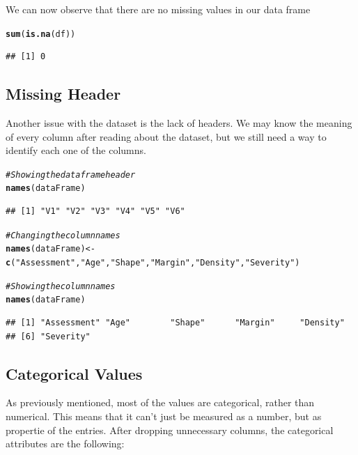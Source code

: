 \documentclass[a4paper,12pt]{article}\usepackage[]{graphicx}\usepackage[]{color}
\makeatletter
\newcommand{\hlstr}[1]{\textcolor[rgb]{0.192,0.494,0.8}{#1}}%
\newcommand{\hlcom}[1]{\textcolor[rgb]{0.678,0.584,0.686}{\textit{#1}}}%
\newcommand{\hlstd}[1]{\textcolor[rgb]{0.345,0.345,0.345}{#1}}%
\newcommand{\hlkwb}[1]{\textcolor[rgb]{0.69,0.353,0.396}{#1}}%
\newcommand{\hlkwd}[1]{\textcolor[rgb]{0.737,0.353,0.396}{\textbf{#1}}}%
\newenvironment{kframe}{%
 \def\at@end@of@kframe{}%
 \ifinner\ifhmode%
  \def\at@end@of@kframe{\end{minipage}}%
  \begin{minipage}{\columnwidth}%
 \fi\fi%
 \def\FrameCommand##1{\hskip\@totalleftmargin \hskip-\fboxsep
 \colorbox{shadecolor}{##1}\hskip-\fboxsep
     \hskip-\linewidth \hskip-\@totalleftmargin \hskip\columnwidth}%
 \MakeFramed {\advance\hsize-\width
   \@totalleftmargin\z@ \linewidth\hsize
   \@setminipage}}%
 {\par\unskip\endMakeFramed%
 \at@end@of@kframe}
\newenvironment{knitrout}{}{} %
\makeatother
\begin{document}
We can now observe that there are no missing values in our data frame

\begin{knitrout}
\color{fgcolor}\begin{kframe}
\begin{alltt}
\hlkwd{sum}\hlstd{(}\hlkwd{is.na}\hlstd{(df))}
\end{alltt}
\begin{verbatim}
## [1] 0
\end{verbatim}
\end{kframe}
\end{knitrout}

\subsection{Missing Header}\label{missing_header}
Another issue with the dataset is the lack of headers. We may know the meaning of every column after reading about the dataset, but we still need a way to identify each one of the columns.

\begin{knitrout}
\color{fgcolor}\begin{kframe}
\begin{alltt}
\hlcom{# Showing the data frame header}
\hlkwd{names}\hlstd{(dataFrame)}
\end{alltt}
\begin{verbatim}
## [1] "V1" "V2" "V3" "V4" "V5" "V6"
\end{verbatim}
\begin{alltt}
\hlcom{# Changing the column names}
\hlkwd{names}\hlstd{(dataFrame)} \hlkwb{<-} \hlkwd{c}\hlstd{(}\hlstr{"Assessment"}\hlstd{,}\hlstr{"Age"}\hlstd{,}\hlstr{"Shape"}\hlstd{,}\hlstr{"Margin"}\hlstd{,}\hlstr{"Density"}\hlstd{,} \hlstr{"Severity"}\hlstd{)}

\hlcom{# Showing the column names}
\hlkwd{names}\hlstd{(dataFrame)}
\end{alltt}
\begin{verbatim}
## [1] "Assessment" "Age"        "Shape"      "Margin"     "Density"   
## [6] "Severity"
\end{verbatim}
\end{kframe}
\end{knitrout}

\clearpage

\subsection{Categorical Values}\label{categorical_values}
As previously mentioned, most of the values are categorical, rather than numerical. This means that it can't just be measured as a number, but as propertie of the entries. After dropping unnecessary columns, the categorical attributes are the following:
\end{document}
